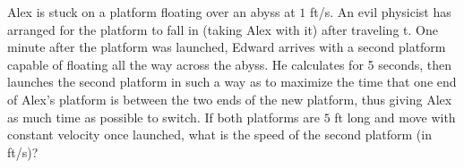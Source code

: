 Alex is stuck on a platform floating over an abyss at $1$ ft/s. An evil physicist has arranged for the platform to fall in (taking Alex with it) after traveling t. One minute after the platform was launched, Edward arrives with a second platform capable of floating all the way across the abyss. He calculates for 5 seconds, then launches the second platform in such a way as to maximize the time that one end of Alex's platform is between the two ends of the new platform, thus giving Alex as much time as possible to switch. If both platforms are $5$ ft long and move with constant velocity once launched, what is the speed of the second platform (in ft/s)?